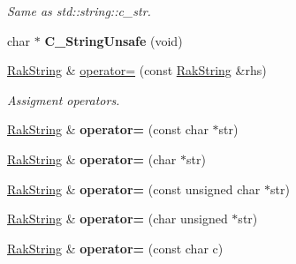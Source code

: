 \begin{DoxyCompactItemize}
\begin{DoxyCompactList}\small\item\em Same as std\-::string\-::c\-\_\-str. \end{DoxyCompactList}\item 
\hypertarget{class_rak_net_1_1_rak_string_a9ef0787c019c299308bf79d4e030f411}{char $\ast$ {\bfseries C\-\_\-\-String\-Unsafe} (void)}\label{class_rak_net_1_1_rak_string_a9ef0787c019c299308bf79d4e030f411}

\item 
\hypertarget{class_rak_net_1_1_rak_string_af8e7f5fe6bee4d8b045d3802ac503723}{\hyperlink{class_rak_net_1_1_rak_string}{Rak\-String} \& \hyperlink{class_rak_net_1_1_rak_string_af8e7f5fe6bee4d8b045d3802ac503723}{operator=} (const \hyperlink{class_rak_net_1_1_rak_string}{Rak\-String} \&rhs)}\label{class_rak_net_1_1_rak_string_af8e7f5fe6bee4d8b045d3802ac503723}

\begin{DoxyCompactList}\small\item\em Assigment operators. \end{DoxyCompactList}\item 
\hypertarget{class_rak_net_1_1_rak_string_a55e6c8c035ea6a76620eca546602c2a3}{\hyperlink{class_rak_net_1_1_rak_string}{Rak\-String} \& {\bfseries operator=} (const char $\ast$str)}\label{class_rak_net_1_1_rak_string_a55e6c8c035ea6a76620eca546602c2a3}

\item 
\hypertarget{class_rak_net_1_1_rak_string_a7cdda8c1f9ba8f57836cdeb7479c8053}{\hyperlink{class_rak_net_1_1_rak_string}{Rak\-String} \& {\bfseries operator=} (char $\ast$str)}\label{class_rak_net_1_1_rak_string_a7cdda8c1f9ba8f57836cdeb7479c8053}

\item 
\hypertarget{class_rak_net_1_1_rak_string_a6abdeb25bebe3ab33e757af896ca9f16}{\hyperlink{class_rak_net_1_1_rak_string}{Rak\-String} \& {\bfseries operator=} (const unsigned char $\ast$str)}\label{class_rak_net_1_1_rak_string_a6abdeb25bebe3ab33e757af896ca9f16}

\item 
\hypertarget{class_rak_net_1_1_rak_string_a76e7217abb7578e77cc1afeea02e6fe3}{\hyperlink{class_rak_net_1_1_rak_string}{Rak\-String} \& {\bfseries operator=} (char unsigned $\ast$str)}\label{class_rak_net_1_1_rak_string_a76e7217abb7578e77cc1afeea02e6fe3}

\item 
\hypertarget{class_rak_net_1_1_rak_string_aad0bd7edc99ac57a4ddf1c4c1432f109}{\hyperlink{class_rak_net_1_1_rak_string}{Rak\-String} \& {\bfseries operator=} (const char c)}\label{class_rak_net_1_1_rak_string_aad0bd7edc99ac57a4ddf1c4c1432f109}


\end{DoxyCompactItemize}
